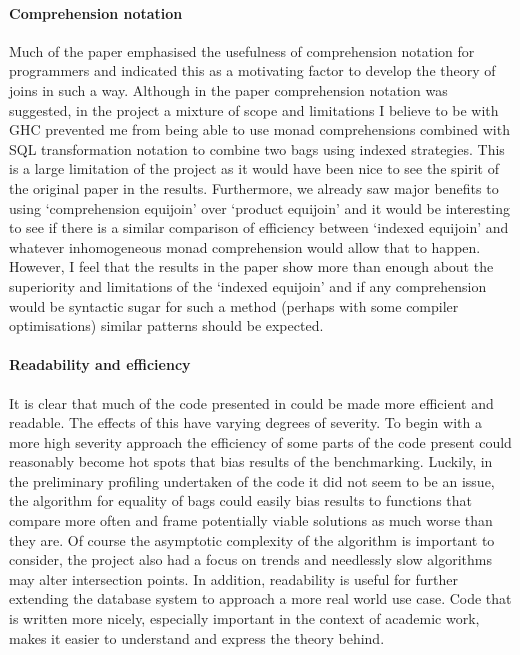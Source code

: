 \paragraph{Comprehension notation} Much of the paper \relalg{} emphasised the
usefulness of comprehension notation for programmers and indicated this as a
motivating factor to develop the theory of joins in such a way. Although in the
paper comprehension notation was suggested, in the project a mixture of scope
and limitations I believe to be with GHC prevented me from being able to use
monad comprehensions combined with SQL transformation notation to combine two
bags using indexed strategies. This is a large limitation of the project as it
would have been nice to see the spirit of the original paper in the results.
Furthermore, we already saw major benefits to using `comprehension equijoin'
over `product equijoin' and it would be interesting to see if there is a similar
comparison of efficiency between `indexed equijoin' and whatever inhomogeneous
monad comprehension would allow that to happen. However, I feel that the results
in the paper show more than enough about the superiority and limitations of the
`indexed equijoin' and if any comprehension would be syntactic sugar for such a
method (perhaps with some compiler optimisations) similar patterns should be
expected.

\paragraph{Readability and efficiency} It is clear that much of the code
presented in  could be made more efficient and
readable. The effects of this have varying degrees of severity. To begin with a
more high severity approach the efficiency of some parts of the code present
could reasonably become hot spots that bias results of the benchmarking.
Luckily, in the preliminary profiling undertaken of the code it did not seem to
be an issue, the algorithm for equality of bags could easily bias results to
functions that compare more often and frame potentially viable solutions as much
worse than they are. Of course the asymptotic complexity of the algorithm is
important to consider, the project also had a focus on trends and needlessly
slow algorithms may alter intersection points. In addition, readability is useful for further extending the
database system to approach a more real world use case. Code that
is written more nicely, especially important in the context of academic work,
makes it easier to understand and express the theory behind.
